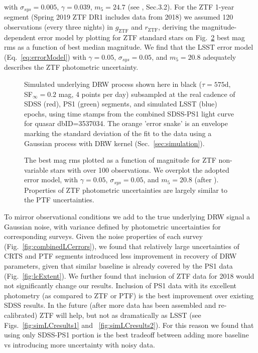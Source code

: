 \documentclass[twocolumn]{aastex62}
\begin{document}
with  $\sigma_{sys} = 0.005$, $\gamma=0.039$, $m_{5} = 24.7$ (see \citet{ivezic2019}, Sec.3.2).
For the ZTF 1-year segment (Spring 2019 ZTF DR1 includes data from 2018) we assumed 120 observations (every three nights) in $g_{\mathrm{ZTF}}$ and $r_{\mathrm{ZTF}}$, deriving the magnitude-dependent error model by plotting for ZTF standard stars on Fig.~\ref{fig:ztf_errors} best mag rms as a function of best median magnitude. We find that the LSST error model (Eq.~\ref{eq:errorModel}) with $\gamma = 0.05$, $\sigma_{sys} = 0.05 $, and $m_{5} = 20.8$ adequately describes the ZTF photometric uncertainty. 

\begin{figure}%
\caption{Simulated underlying DRW process shown here in black ($\tau=575$d, SF$_{\infty} = 0.2$ mag, 4 points per day) subsampled at the real cadence of SDSS (red), PS1 (green) segments, and simulated LSST (blue) epochs, using time stamps from the combined SDSS-PS1 light curve for quasar dbID=3537034. The orange 'error snake' is an envelope marking the standard deviation of the fit to the data using a Gaussian process  with DRW kernel (Sec.~\ref{sec:simulation}).}
\label{fig:simLC}
\end{figure} 

\begin{figure}%
\caption{The best mag rms plotted as a function of magnitude for ZTF non-variable stars with over 100 observations. We overplot the adopted error model, with $\gamma = 0.05$, $\sigma_{sys} = 0.05 $, and $m_{5} = 20.8$ (after \citealt{ivezic2019}). Properties of ZTF photometric uncertainties are largely similar to the PTF uncertainties.}
\label{fig:ztf_errors}
\end{figure} 


To mirror observational conditions we add to the true underlying DRW signal a Gaussian noise, with variance defined by photometric uncertainties for corresponding surveys. Given the noise properties of each survey (Fig.~\ref{fig:combinedLCerrors}), we found that relatively large uncertainties of CRTS and PTF segments introduced less improvement in recovery of DRW parameters, given that similar baseline is already covered by the PS1 data (Fig.~\ref{fig:lcExtent}).  We further found that inclusion of ZTF data for 2018 would not significantly change our results. Inclusion of PS1 data with its excellent photometry (as compared to ZTF or PTF) is the best improvement over existing SDSS results.  In the future (after more data has been assembled and re-calibrated) ZTF will help, but not as dramatically as LSST (see Figs.~\ref{fig:simLCresults1} and ~\ref{fig:simLCresults2}).  For this reason we found that using only SDSS-PS1 portion is the best tradeoff between adding more baseline vs introducing more uncertainty with noisy data.
\end{document}
